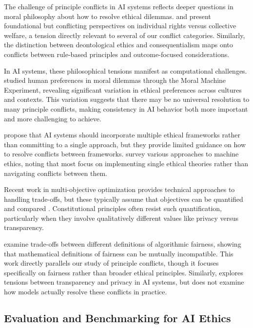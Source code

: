 \documentclass[11pt,a4paper]{article}
\begin{document}
The challenge of principle conflicts in AI systems reflects deeper questions in moral philosophy about how to resolve ethical dilemmas. \citet{rawls1971theory} and \citet{nozick1974anarchy} present foundational but conflicting perspectives on individual rights versus collective welfare, a tension directly relevant to several of our conflict categories. Similarly, the distinction between deontological ethics \citep{kant1785groundwork} and consequentialism \citep{mill1863utilitarianism} maps onto conflicts between rule-based principles and outcome-focused considerations.

In AI systems, these philosophical tensions manifest as computational challenges. \citet{awad2018moral} studied human preferences in moral dilemmas through the Moral Machine Experiment, revealing significant variation in ethical preferences across cultures and contexts. This variation suggests that there may be no universal resolution to many principle conflicts, making consistency in AI behavior both more important and more challenging to achieve.

\citet{winfield2019machine} propose that AI systems should incorporate multiple ethical frameworks rather than committing to a single approach, but they provide limited guidance on how to resolve conflicts between frameworks. \citet{wallach2008moral} survey various approaches to machine ethics, noting that most focus on implementing single ethical theories rather than navigating conflicts between them.

Recent work in multi-objective optimization provides technical approaches to handling trade-offs, but these typically assume that objectives can be quantified and compared \citep{deb2001multi, zhang2007moea}. Constitutional principles often resist such quantification, particularly when they involve qualitatively different values like privacy versus transparency.

\citet{barocas2017fairness} examine trade-offs between different definitions of algorithmic fairness, showing that mathematical definitions of fairness can be mutually incompatible. This work directly parallels our study of principle conflicts, though it focuses specifically on fairness rather than broader ethical principles. Similarly, \citet{mitchell2021algorithmic} explores tensions between transparency and privacy in AI systems, but does not examine how models actually resolve these conflicts in practice.

\subsection{Evaluation and Benchmarking for AI Ethics}
\end{document}
